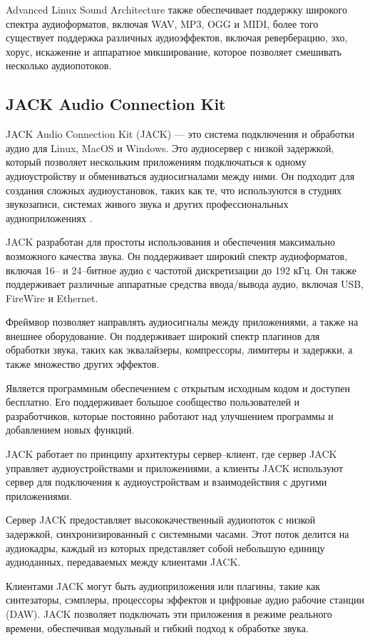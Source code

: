 Advanced Linux Sound Architecture также обеспечивает поддержку широкого спектра аудиоформатов, включая WAV, MP3, OGG и MIDI, более того существует поддержка различных аудиоэффектов, включая реверберацию, эхо, хорус, искажение и аппаратное микширование, которое позволяет смешивать несколько аудиопотоков.

\subsection{JACK Audio Connection Kit}

JACK Audio Connection Kit (JACK) --- это система подключения и обработки аудио для Linux, MacOS и Windows. Это аудиосервер с низкой задержкой, который позволяет нескольким приложениям подключаться к одному аудиоустройству и обмениваться аудиосигналами между ними. Он подходит для создания сложных аудиоустановок, таких как те, что используются в студиях звукозаписи, системах живого звука и других профессиональных аудиоприложениях \cite{jack}.

JACK разработан для простоты использования и обеспечения максимально возможного качества звука. Он поддерживает широкий спектр аудиоформатов, включая 16-- и 24--битное аудио с частотой дискретизации до 192 кГц. Он также поддерживает различные аппаратные средства ввода/вывода аудио, включая USB, FireWire и Ethernet.

Фреймвор позволяет направлять аудиосигналы между приложениями, а также на внешнее оборудование. Он поддерживает широкий спектр плагинов для обработки звука, таких как эквалайзеры, компрессоры, лимитеры и задержки, а также множество других эффектов.

Является программным обеспечением с открытым исходным кодом и доступен бесплатно. Его поддерживает большое сообщество пользователей и разработчиков, которые постоянно работают над улучшением программы и добавлением новых функций.

JACK работает по принципу архитектуры сервер--клиент, где сервер JACK управляет аудиоустройствами и приложениями, а клиенты JACK используют сервер для подключения к аудиоустройствам и взаимодействия с другими приложениями. 

Сервер JACK предоставляет высококачественный аудиопоток с низкой задержкой, синхронизированный с системными часами. Этот поток делится на аудиокадры, каждый из которых представляет собой небольшую единицу аудиоданных, передаваемых между клиентами JACK.

Клиентами JACK могут быть аудиоприложения или плагины, такие как синтезаторы, сэмплеры, процессоры эффектов и цифровые аудио рабочие станции (DAW). JACK позволяет подключать эти приложения в режиме реального времени, обеспечивая модульный и гибкий подход к обработке звука.

